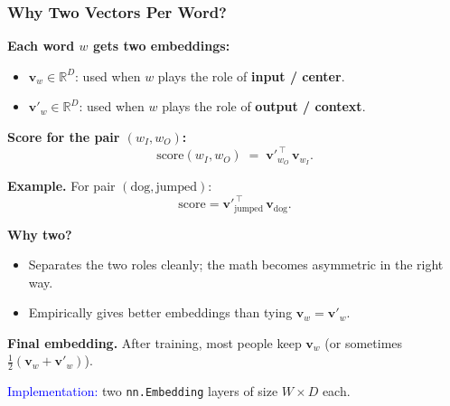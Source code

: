 \documentclass[notes,11pt, aspectratio=169]{beamer}
\newcommand{\vv}{\mathbf{v}}
\newcommand{\R}{\mathbb{R}}
\begin{document}
\begin{frame}
\frametitle{Why Two Vectors Per Word?}

\textbf{Each word $w$ gets two embeddings:}
\begin{itemize}
    \item $\vv_w \in \R^D$: used when $w$ plays the role of \textbf{input / center}.
    \item $\vv'_w \in \R^D$: used when $w$ plays the role of \textbf{output / context}.
\end{itemize}

\vspace{8pt}
\textbf{Score for the pair $(w_I, w_O)$:}
\[
    \text{score}(w_I, w_O) \;=\; \vv'^{\,\top}_{w_O}\, \vv_{w_I}.
\]

\vspace{6pt}
\textbf{Example.} For pair $(\text{dog}, \text{jumped})$:
\[
    \text{score} = \vv'^{\,\top}_\text{jumped}\, \vv_\text{dog}.
\]

\vspace{8pt}
\textbf{Why two?}
\begin{itemize}
    \item Separates the two roles cleanly; the math becomes asymmetric in the right way.
    \item Empirically gives better embeddings than tying $\vv_w = \vv'_w$.
\end{itemize}

\textbf{Final embedding.} After training, most people keep $\vv_w$ (or sometimes $\tfrac{1}{2}(\vv_w + \vv'_w)$).

\vspace{4pt}
\textcolor{blue}{Implementation:} two \texttt{nn.Embedding} layers of size $W \times D$ each.
\end{frame}
\end{document}
